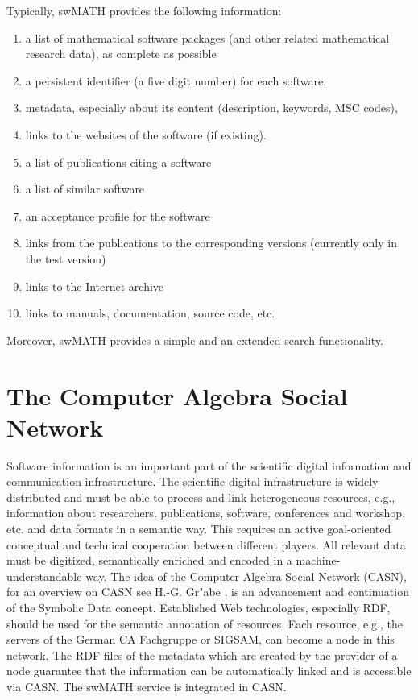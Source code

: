 \documentclass[12pt]{article}
\begin{document}
Typically, swMATH provides the following information:
\begin{enumerate}
\item a list of mathematical software packages (and other related mathematical
  research data), as complete as possible
\item a persistent identifier (a five digit number) for each software,
\item metadata, especially about its content (description, keywords, MSC
  codes),
\item links  to the websites of the software (if existing).
\item a list of publications citing a software
\item a list of similar software
\item an acceptance profile for the software
\item links from the publications to the corresponding versions (currently only
  in the test version)
\item links to the Internet archive
\item links to manuals, documentation, source code, etc.
\end{enumerate}

Moreover, swMATH provides a simple and an extended search functionality.


\section{The Computer Algebra Social Network}
Software information is an important part of the scientific digital information
and communication infrastructure. The scientific digital infrastructure is
widely distributed and must be able to process and link heterogeneous
resources, e.g., information about researchers, publications, software,
conferences and workshop, etc. and data formats in a semantic way.  This
requires an active goal-oriented conceptual and technical cooperation between
different players. All relevant data must be digitized, semantically enriched
and encoded in a machine-understandable way.  The idea of the Computer Algebra
Social Network (CASN), for an overview on CASN see H.-G. Gr"abe \cite{CASN}, is
an advancement and continuation of the Symbolic Data concept. Established Web
technologies, especially RDF, should be used for the semantic annotation of
resources. Each resource, e.g., the servers of the German CA Fachgruppe or
SIGSAM, can become a node in this network. The RDF files of the metadata which
are created by the provider of a node guarantee that the information can be
automatically linked and is accessible via CASN. The swMATH service is
integrated in CASN.
\end{document}
